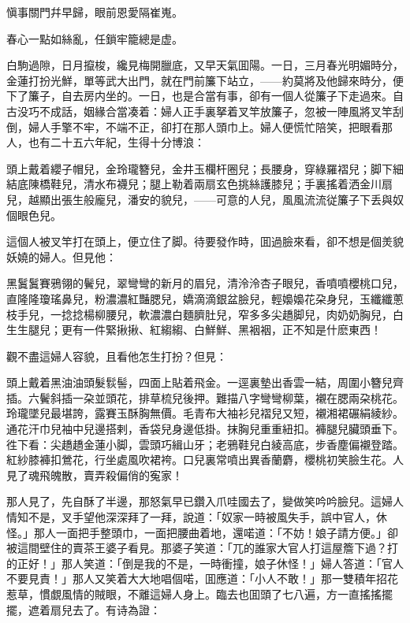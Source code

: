 \begin{myquote}
愼事關門幷早歸，眼前恩愛隔崔嵬。

春心一點如絲亂，任鎖牢籠總是虚。
\end{myquote}

白駒過隙，日月攛梭，纔見梅開臘底，又早天氣囬陽。一日，三月春光明媚時分，金蓮打扮光鮮，單等武大出門，就在門前簾下站立，——約莫將及他歸來時分，便下了簾子，自去房内坐的。一日，也是合當有事，卻有一個人從簾子下走過來。自古没巧不成話，姻緣合當凑着：婦人正手裏拏着叉竿放簾子，忽被一陣風將叉竿刮倒，婦人手擎不牢，不端不正，卻打在那人頭巾上。婦人便慌忙陪笑，把眼看那人，也有二十五六年紀，生得十分博浪：

\begin{myquote}
頭上戴着纓子帽兒，金玲瓏簪兒，金井玉欄杆圈兒；長腰身，穿綠羅褶兒；脚下細結底陳橋鞋兒，清水布襪兒；腿上勒着兩扇玄色挑絲護膝兒；手裏搖着洒金川扇兒，越顯出張生般龐兒，潘安的貌兒，——可意的人兒，風風流流従簾子下丢與奴個眼色兒。
\end{myquote}

這個人被叉竿打在頭上，便立住了脚。待要發作時，囬過臉來看，卻不想是個羙貌妖嬈的婦人。但見他：

\begin{myquote}
黑鬒鬒賽鴉翎的鬢兒，翠彎彎的新月的眉兒，清泠泠杏子眼兒，香噴噴櫻桃口兒，直隆隆瓊瑤鼻兒，粉濃濃紅豔腮兒，嬌滴滴銀盆臉兒，輕嬝嬝花朶身兒，玉纖纖蔥枝手兒，一捻捻楊柳腰兒，軟濃濃白麵臍肚兒，窄多多尖趫脚兒，肉奶奶胸兒，白生生腿兒；更有一件緊揪揪、紅縐縐、白鮮鮮、黑裀裀，正不知是什麽東西！
\end{myquote}

觀不盡這婦人容貌，且看他怎生打扮？但見：

\begin{myquote}
頭上戴着黑油油頭髮䯼髻，四面上貼着飛金。一逕裏墊出香雲一結，周圍小簪兒齊插。六鬢斜插一朶並頭花，排草梳兒後押。難描八字彎彎柳葉，襯在腮兩朶桃花。玲瓏墜兒最堪誇，露賽玉酥胸無價。毛青布大袖衫兒褶兒又短，襯湘裙碾絹綾紗。通花汗巾兒袖中兒邊搭剌，香袋兒身邊低掛。抹胸兒重重紐扣。褲腿兒臟頭垂下。徃下看：尖趫趫金蓮小脚，雲頭巧緝山牙；老鴉鞋兒白綾高底，步香塵偏襯登踏。紅紗膝褲扣鶯花，行坐處風吹裙袴。口兒裏常噴出異香蘭麝，櫻桃初笑臉生花。人見了魂飛魄散，賣弄殺偏俏的寃家！
\end{myquote}

那人見了，先自酥了半邊，那怒氣早已鑽入爪哇國去了，變做笑吟吟臉兒。這婦人情知不是，叉手望他深深拜了一拜，說道：「奴家一時被風失手，誤中官人，休怪。」那人一面把手整頭巾，一面把腰曲着地，還喏道：「不妨！娘子請方便。」卻被這間壁住的賣茶王婆子看見。那婆子笑道：「兀的誰家大官人打這屋簷下過？打的正好！」那人笑道：「倒是我的不是，一時衝撞，娘子休怪！」婦人答道：「官人不要見責！」那人又笑着大大地唱個喏，囬應道：「小人不敢！」那一雙積年招花惹草，慣覷風情的賊眼，不離這婦人身上。臨去也囬頭了七八遍，方一直搖搖擺擺，遮着扇兒去了。有诗為證：

